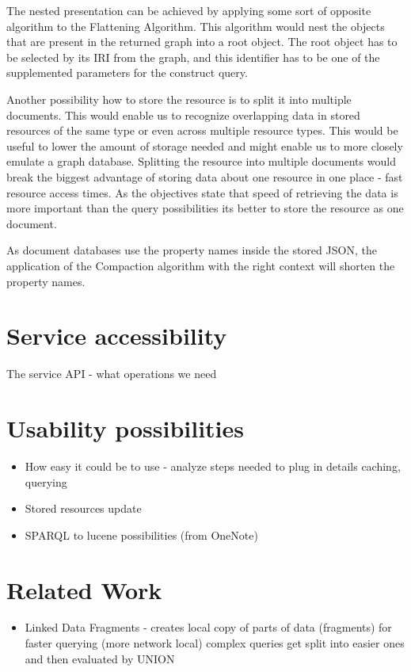 The nested presentation can be achieved by applying some sort of opposite algorithm to the Flattening Algorithm. This algorithm would nest the objects that are present in the returned graph into a root object. The root object has to be selected by its IRI from the graph, and this identifier has to be one of the supplemented parameters for the construct query.

Another possibility how to store the resource is to split it into multiple documents. This would enable us to recognize overlapping data in stored resources of the same type or even across multiple resource types. This would be useful to lower the amount of storage needed and might enable us to more closely emulate a graph database. Splitting the resource into multiple documents would break the biggest advantage of storing data about one resource in one place - fast resource access times. As the objectives state that speed of retrieving the data is more important than the query possibilities its better to store the resource as one document.

As document databases use the property names inside the stored JSON, the application of the Compaction algorithm with the right context will shorten the property names.

\section{Service accessibility}
The service API - what operations we need

\section{Usability possibilities}
\begin{itemize}
	\item How easy it could be to use - analyze steps needed to plug in details caching, querying
	\item Stored resources update
	\item SPARQL to lucene possibilities (from OneNote)
\end{itemize}

\section{Related Work}
\begin{itemize}
	\item Linked Data Fragments - creates local copy of parts of data (fragments) for faster querying (more network local) complex queries get split into easier ones and then evaluated by UNION
\end{itemize}

